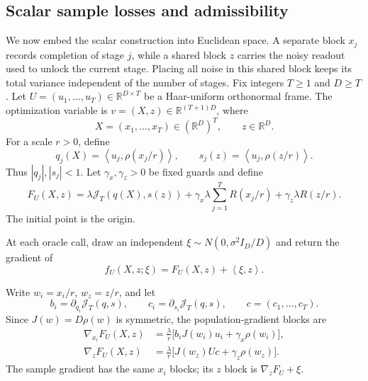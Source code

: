 \documentclass[11pt]{article}
\newcommand{\R}{\mathbb R}
\newcommand{\ip}[2]{\left\langle #1,#2\right\rangle}
\theoremstyle{definition}
\theoremstyle{remark}
\begin{document}
\subsection{Scalar sample losses and admissibility}
We now embed the scalar construction into Euclidean space. A separate block
$x_j$ records completion of stage $j$, while a shared block $z$ carries the
noisy readout used to unlock the current stage. Placing all noise in this
shared block keeps its total variance independent of the number of stages.
Fix integers \(T\ge1\) and \(D\ge T\).  Let
\(U=(u_1,\ldots,u_T)\in\R^{D\times T}\) be a Haar-uniform orthonormal frame.  The optimization variable is $v=(X,z)\in\R^{(T+1)D}$, where
\[
 X=(x_1,\ldots,x_T)\in(\R^D)^T,
 \qquad z\in\R^D.
\]
For a scale \(r>0\), define
\begin{equation}\label{eq:encoded-coordinates}
 q_j(X)=\ip{u_j}{\rho(x_j/r)},
 \qquad
 s_j(z)=\ip{u_j}{\rho(z/r)}.
\end{equation}
Thus \(|q_j|,|s_j|<1\).  Let \(\gamma_x,\gamma_z>0\) be fixed guards and define
\begin{equation}\label{eq:population-objective}
 F_U(X,z)
 =\lambda\mathcal J_T(q(X),s(z))
 +\gamma_x\lambda\sum_{j=1}^T R(x_j/r)
 +\gamma_z\lambda R(z/r).
\end{equation}
The initial point is the origin.

At each oracle call, draw an independent
$\xi\sim N(0,\sigma^2I_D/D)$ and return the gradient of
\begin{equation}\label{eq:sample-loss}
 f_U(X,z;\xi)=F_U(X,z)+\ip{\xi}{z}.
\end{equation}

Write $w_i=x_i/r$, $w_z=z/r$, and let
\[
 b_i=\partial_{q_i}\mathcal J_T(q,s),
 \qquad c_i=\partial_{s_i}\mathcal J_T(q,s),
 \qquad c=(c_1,\ldots,c_T).
\]
Since $J(w)=D\rho(w)$ is symmetric, the population-gradient blocks are
\begin{align}
 \nabla_{x_i}F_U(X,z)
 &=\frac{\lambda}{r}
   \bigl[b_iJ(w_i)u_i+\gamma_x\rho(w_i)\bigr],
 \label{eq:all-x-gradients}\\
 \nabla_zF_U(X,z)
 &=\frac{\lambda}{r}
   \bigl[J(w_z)Uc+\gamma_z\rho(w_z)\bigr].
 \label{eq:all-z-gradient}
\end{align}
The sample gradient has the same $x_i$ blocks; its $z$ block is
$\nabla_zF_U+\xi$.
\end{document}
